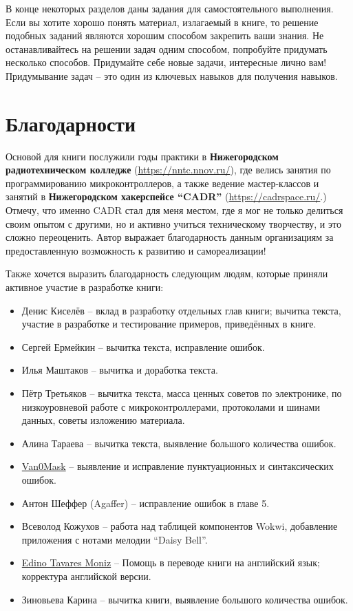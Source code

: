 \documentclass[../sparc.tex]{subfiles}
\begin{document}
В конце некоторых разделов даны задания для самостоятельного выполнения.  Если
вы хотите хорошо понять материал, излагаемый в книге, то решение подобных
заданий являются хорошим способом закрепить ваши знания.  Не останавливайтесь на
решении задач одним способом, попробуйте придумать несколько способов.
Придумайте себе новые задачи, интересные лично вам!  Придумывание задач -- это
один из ключевых навыков для получения навыков.

\section*{Благодарности}

Основой для книги послужили годы практики в \textbf{Нижегородском
  радиотехническом колледже} (\url{https://nntc.nnov.ru/}), где велись занятия
по программированию микроконтроллеров, а также ведение мастер-классов и занятий
в \textbf{Нижегородском хакерспейсе ``CADR''} (\url{https://cadrspace.ru/}.)
Отмечу, что именно CADR стал для меня местом, где я мог не только делиться своим
опытом с другими, но и активно учиться техническому творчеству, и это сложно
переоценить.  Автор выражает благодарность данным организациям за
предоставленную возможность к развитию и самореализации!

Также хочется выразить благодарность следующим людям, которые приняли активное
участие в разработке книги:
\begin{itemize}
\item Денис Киселёв -- вклад в разработку отдельных глав книги; вычитка текста,
  участие в разработке и тестирование примеров, приведённых в книге.
\item Сергей Ермейкин -- вычитка текста, исправление ошибок.
\item Илья Маштаков – вычитка и доработка текста.
\item Пётр Третьяков -- вычитка текста, масса ценных советов по электронике,
  по низкоуровневой работе с микроконтроллерами, протоколами и шинами данных,
  советы изложению материала.
\item Алина Тараева -- вычитка текста, выявление большого количества ошибок.
\item \href{https://github.com/V4n0M4sk}{Van0Mask} -- выявление и исправление
  пунктуационных и синтаксических ошибок.
\item Антон Шеффер (Agaffer) -- исправление ошибок в главе 5.
\item Всеволод Кожухов -- работа над таблицей компонентов Wokwi, добавление
  приложения с нотами мелодии ``Daisy Bell''.
\item \href{https://github.com/onidemon37}{Edino Tavares Moniz} -- Помощь в
  переводе книги на английский язык; корректура английской версии.
\item Зиновьева Карина -- вычитка книги, выявление большого количества ошибок.
\end{itemize}
\end{document}
